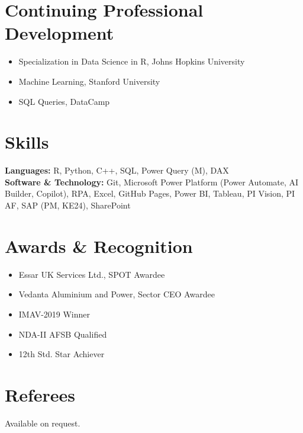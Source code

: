 \documentclass[11pt,a4paper]{article}
\begin{document}
\section*{Continuing Professional Development}
\begin{itemize}
    \item Specialization in Data Science in R, Johns Hopkins University
    \item Machine Learning, Stanford University
    \item SQL Queries, DataCamp
\end{itemize}

\section*{Skills}
\textbf{Languages:} R, Python, C++, SQL, Power Query (M), DAX \\
\textbf{Software \& Technology:} Git, Microsoft Power Platform (Power
Automate, AI Builder, Copilot), RPA, Excel, GitHub Pages, Power BI, Tableau,
PI Vision, PI AF, SAP (PM, KE24), SharePoint

\section*{Awards \& Recognition}
\begin{itemize}
    \item Essar UK Services Ltd., SPOT Awardee
    \item Vedanta Aluminium and Power, Sector CEO Awardee
    \item IMAV-2019 Winner
    \item NDA-II AFSB Qualified
    \item 12th Std. Star Achiever
\end{itemize}

\section*{Referees}
Available on request.
\end{document}
